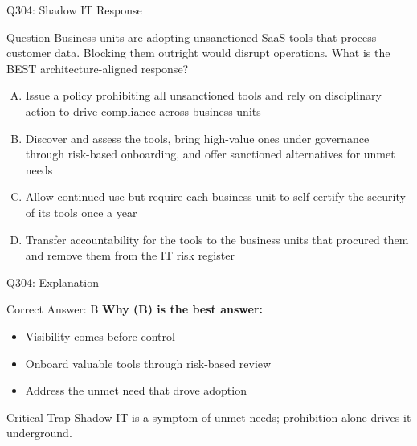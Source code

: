 \documentclass{beamer}
\begin{document}
	\begin{frame}{Q304: Shadow IT Response}
		\begin{block}{Question}
			\small Business units are adopting unsanctioned SaaS tools that process customer data. Blocking them outright would disrupt operations. What is the BEST architecture-aligned response?
		\end{block}
		\begin{enumerate}[(A)]
			\footnotesize
			\item Issue a policy prohibiting all unsanctioned tools and rely on disciplinary action to drive compliance across business units
			\item Discover and assess the tools, bring high-value ones under governance through risk-based onboarding, and offer sanctioned alternatives for unmet needs
			\item Allow continued use but require each business unit to self-certify the security of its tools once a year
			\item Transfer accountability for the tools to the business units that procured them and remove them from the IT risk register
		\end{enumerate}
	\end{frame}
	
	\begin{frame}{Q304: Explanation}
		\begin{block}{Correct Answer: B}
			\textbf{Why (B) is the best answer:}
			\begin{itemize}
				\item Visibility comes before control
				\item Onboard valuable tools through risk-based review
				\item Address the unmet need that drove adoption
			\end{itemize}
		\end{block}
		\begin{alertblock}{Critical Trap}
			Shadow IT is a symptom of unmet needs; prohibition alone drives it underground.
		\end{alertblock}
	\end{frame}
	
\end{document}
